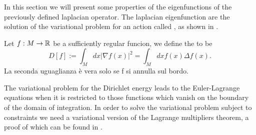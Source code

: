 \documentclass[../2.tex]{subfiles}
\begin{document}
In this section we will present some properties of the eigenfunctions of the previously defined laplacian operator.
The laplacian eigenfunction are the solution of the variational problem for an action called , as shown in \cite{bronstein}.

\begin{defn}
    Let $f:M\to\mathbb{R}$ be a sufficiently regular funcion, we define the  to be
    \[ D[f] := \int_{M} dx |\nabla f(x)|^2 = \int_{M} dx f(x)\Delta f(x) .\]
    {\color{red} La seconda uguaglianza è vera solo se f si annulla sul bordo.}
\end{defn}

The variational problem for the Dirichlet energy leads to the Euler-Lagrange equations when it is restricted to those functions which
vanish on the boundary of the domain of integration. In order to solve the variational problem subject to constraints we need a variational 
version of the Lagrange multipliers theorem, a proof of which can be found in \cite{fomin}.
\end{document}
